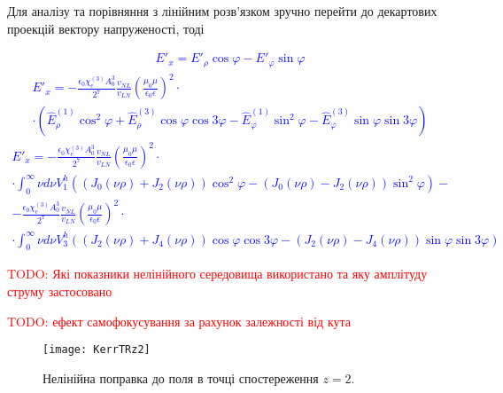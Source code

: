 Для аналізу та порівняння з лінійним розв'язком зручно перейти до 
декартових проекцій вектору напруженості, тоді

\textcolor{blue} { \begin{equation*} \begin{aligned}
E'_x = E'_\rho \cos \varphi - E'_\varphi \sin \varphi
\end{aligned} \end{equation*} }
%
\textcolor{blue} { \begin{equation*} \begin{aligned}
E'_x = - \frac{\epsilon_0 \chi_e^{(3)} A_0^3}{2^7} \frac{v_{NL}}{v_{LN}}
\left( \frac{\mu_0 \mu}{\epsilon_0 \epsilon} \right)^2 \cdot \\ \cdot
\left(\hat{E}_\rho^{(1)} \cos^2 \varphi +
\hat{E}_\rho^{(3)} \cos \varphi \cos 3 \varphi - 
\hat{E}_\varphi^{(1)} \sin^2 \varphi -
\hat{E}_\varphi^{(3)} \sin \varphi \sin 3 \varphi \right)
\end{aligned} \end{equation*} }
%
\textcolor{blue} { \begin{equation*} \begin{aligned}
E'_x = - \frac{\epsilon_0 \chi_e^{(3)} A_0^3}{2^7} \frac{v_{NL}}{v_{LN}}
\left( \frac{\mu_0 \mu}{\epsilon_0 \epsilon} \right)^2 \cdot \\ \cdot
\int_0^\infty \nu d \nu V_1^h \left( 
\left( J_0 (\nu \rho) + J_2 (\nu \rho) \right) \cos^2 \varphi -
\left( J_0 (\nu \rho) - J_2 (\nu \rho) \right) \sin^2 \varphi \right) - \\
- \frac{\epsilon_0 \chi_e^{(3)} A_0^3}{2^7} \frac{v_{NL}}{v_{LN}}
\left( \frac{\mu_0 \mu}{\epsilon_0 \epsilon} \right)^2 \cdot \\ \cdot
\int_0^\infty \nu d \nu V_3^h \left( 
\left( J_2 (\nu \rho) + J_4 (\nu \rho) \right) \cos \varphi \cos 3 \varphi -
\left( J_2 (\nu \rho) - J_4 (\nu \rho) \right) \sin \varphi \sin 3 \varphi 
\right)
\end{aligned} \end{equation*} }


\textcolor{red} {TODO: Які показники нелінійного середовища використано та яку амплітуду струму застосовано}

\textcolor{red} {TODO: ефект самофокусування за рахунок залежності від кута}

\begin{figure}[htbp] \begin{center}
\texttt{[image: KerrTRz2]}
\caption{Нелінійна поправка до поля в точці спостереження $ z = 2 $.} 
\label{fig:KerrTRz2}
\end{center} \end{figure}

